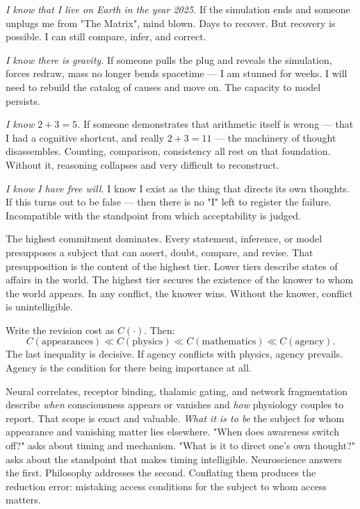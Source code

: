 \textit{I know that I live on Earth in the year 2025.} If the simulation ends and someone unplugs me from "The Matrix", mind blown. Days to recover. But recovery is possible. I can still compare, infer, and correct.

\textit{I know there is gravity.} If someone pulls the plug and reveals the simulation, forces redraw, mass no longer bends spacetime — I am stunned for weeks. I will need to rebuild the catalog of causes and move on. The capacity to model persists.

\textit{I know $2+3=5$.} If someone demonstrates that arithmetic itself is wrong — that I had a cognitive shortcut, and really $2+3=11$ — the machinery of thought disassembles. Counting, comparison, consistency all rest on that foundation. Without it, reasoning collapses and very difficult to reconstruct.

\textit{I know I have free will.} I know I exist as the thing that directs its own thoughts. If this turns out to be false — then there is no "I" left to register the failure. Incompatible with the standpoint from which acceptability is judged.

\medskip

The highest commitment dominates. Every statement, inference, or model presupposes a subject that can assert, doubt, compare, and revise. That presupposition is the content of the highest tier. Lower tiers describe states of affairs in the world. The highest tier secures the existence of the knower to whom the world appears. In any conflict, the knower wins. Without the knower, conflict is unintelligible.

Write the revision cost as $C(\cdot)$. Then:
\[
C(\text{appearances}) \ll C(\text{physics}) \ll C(\text{mathematics}) \ll C(\text{agency}).
\]
The last inequality is decisive. If agency conflicts with physics, agency prevails. Agency is the condition for there being importance at all.

Neural correlates, receptor binding, thalamic gating, and network fragmentation describe \textit{when} consciousness appears or vanishes and \textit{how} physiology couples to report. That scope is exact and valuable. \textit{What it is to be} the subject for whom appearance and vanishing matter lies elsewhere. "When does awareness switch off?" asks about timing and mechanism. "What is it to direct one's own thought?" asks about the standpoint that makes timing intelligible. Neuroscience answers the first. Philosophy addresses the second. Conflating them produces the reduction error: mistaking access conditions for the subject to whom access matters.

